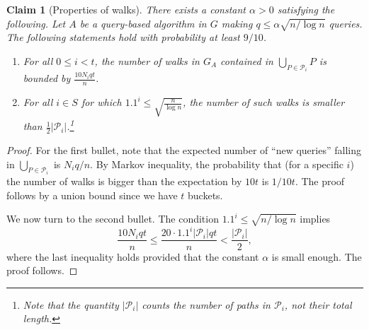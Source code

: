 \documentclass[11pt]{article}
\numberwithin{equation}{section}
\newtheorem{claim}[claim]{Claim}
\renewcommand{\P}{\mathcal{P}}
\newcommand{\1}{\mathbf{1}}
\begin{document}
\begin{claim}[Properties of walks]
\label{claim:walk_properties}
There exists a constant $\alpha > 0$ satisfying the following. Let $A$ be a query-based algorithm in $G$ making $q \leq \alpha \sqrt{n / \log{n}}$ queries. The following statements hold with probability at least $9/10$.
\begin{enumerate}
\item For all $0 \leq i < t$, the number of walks in $G_A$ contained in $\bigcup_{P \in \P_i} P$ is bounded by $\frac{10 N_i q t}{n}$.
\item For all $i \in S$ for which $1.1^i \leq \sqrt{\frac{n}{\log n}}$, the number of such walks is smaller than $\frac{1}{2} |\P_i|$.\footnote{Note that the quantity $|\P_i|$ counts the \emph{number} of paths in $\P_i$, not their total length.} 
\end{enumerate}
\end{claim}
\begin{proof}
For the first bullet, note that the expected number of ``new queries'' falling in $\bigcup_{P \in \P_i}$ is $N_i q / n$. By Markov inequality, the probability that (for a specific $i$) the number of walks is bigger than the expectation by $10t$ is $1/10t$. The proof follows by a union bound since we have $t$ buckets.



We now turn to the second bullet. The condition $1.1^i \leq \sqrt{n / \log n}$ implies
$$
\frac{10 N_i q t}{n} \leq \frac{20 \cdot 1.1^i |\P_i| q t}{n} < \frac{|\P_i|}{2},
$$
where the last inequality holds provided that the constant $\alpha$ is small enough. The proof follows.
\iffalse
In buckets $\P_i$ for which $i \in S$  and $1.1^i \leq c \sqrt{n} / \log^2 n$, we have

For each path $P \in \P_i$, the probability that one of $q$ ``new'' queries falls within $P$ is bounded by $\frac{3|P|q}{n} \leq C / 3\log^2 n$. The expected number of paths containing a query is thus bounded by $C |\P_i| / 3 \log^2 n$. For $i \in S$ in the regime where $|\P_i| \leq 3 \log^2 n / C$, the probability that the statement of the claim \emph{does not} hold with respect to $i$ is bounded by $1 / \log^2 n$, by Markov inequality. For all other $i \in S$, the probability that the claim's statement does not hold is $1 / n^{\Omega(1)}$ by, e.g., Hoeffding's inequality for sampling without replacement (note that in this case, the expected number of bad paths is at least $1$). The proof follows by a union bound over all $i \in S$. 
\fi
\end{proof}
\end{document}
